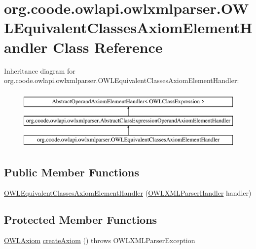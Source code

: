 \hypertarget{classorg_1_1coode_1_1owlapi_1_1owlxmlparser_1_1_o_w_l_equivalent_classes_axiom_element_handler}{\section{org.\-coode.\-owlapi.\-owlxmlparser.\-O\-W\-L\-Equivalent\-Classes\-Axiom\-Element\-Handler Class Reference}
\label{classorg_1_1coode_1_1owlapi_1_1owlxmlparser_1_1_o_w_l_equivalent_classes_axiom_element_handler}
}
Inheritance diagram for org.\-coode.\-owlapi.\-owlxmlparser.\-O\-W\-L\-Equivalent\-Classes\-Axiom\-Element\-Handler\-:\begin{figure}[H]
\begin{center}
\leavevmode
\includegraphics[height=3.000000cm]{classorg_1_1coode_1_1owlapi_1_1owlxmlparser_1_1_o_w_l_equivalent_classes_axiom_element_handler}
\end{center}
\end{figure}
\subsection*{Public Member Functions}
\begin{DoxyCompactItemize}
\item 
\hyperlink{classorg_1_1coode_1_1owlapi_1_1owlxmlparser_1_1_o_w_l_equivalent_classes_axiom_element_handler_aae814e8fe9dda7bedd85056d654b6065}{O\-W\-L\-Equivalent\-Classes\-Axiom\-Element\-Handler} (\hyperlink{classorg_1_1coode_1_1owlapi_1_1owlxmlparser_1_1_o_w_l_x_m_l_parser_handler}{O\-W\-L\-X\-M\-L\-Parser\-Handler} handler)
\end{DoxyCompactItemize}
\subsection*{Protected Member Functions}
\begin{DoxyCompactItemize}
\item 
\hyperlink{interfaceorg_1_1semanticweb_1_1owlapi_1_1model_1_1_o_w_l_axiom}{O\-W\-L\-Axiom} \hyperlink{classorg_1_1coode_1_1owlapi_1_1owlxmlparser_1_1_o_w_l_equivalent_classes_axiom_element_handler_a2d20ca8f50629f0a7674b9c2d94d4e07}{create\-Axiom} ()  throws O\-W\-L\-X\-M\-L\-Parser\-Exception 
\end{DoxyCompactItemize}


